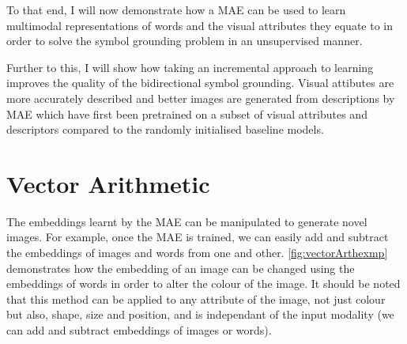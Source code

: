 To that end, I will now demonstrate how a \ac{MAE} can be used to learn multimodal representations of words and the visual attributes they equate to in order to solve the symbol grounding problem in an unsupervised manner.

Further to this, I will show how taking an incremental approach to learning improves the quality of the bidirectional symbol grounding. Visual attibutes are more accurately described and better images are generated from descriptions by \ac{MAE} which have first been pretrained on a subset of visual attributes and descriptors compared to the randomly initialised baseline models.

\section{Vector Arithmetic}
The embeddings learnt by the \ac{MAE} can be manipulated to generate novel images. For example, once the \ac{MAE} is trained, we can easily add and subtract the embeddings of images and words from one and other. \autoref{fig:vectorArthexmp} demonstrates how the embedding of an image can be changed using the embeddings of words in order to alter the colour of the image. It should be noted that this method can be applied to any attribute of the image, not just colour but also, shape, size and position, and is independant of the input modality (we can add and subtract embeddings of images or words).

